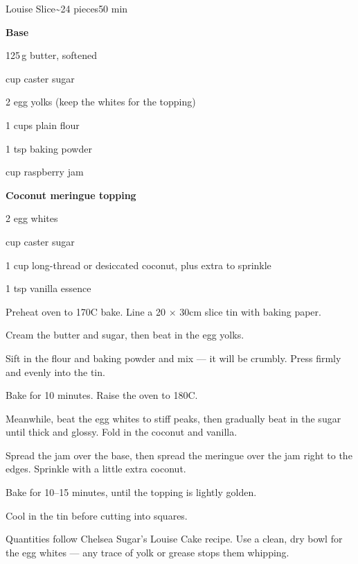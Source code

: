 \begin{recipebox}{Louise Slice}{\textasciitilde24 pieces}{50 min}
\begin{ingredients}
  \item[] \textbf{Base}
  \item 125\,g butter, softened
  \item {} cup caster sugar
  \item 2 egg yolks (keep the whites for the topping)
  \item 1 cups plain flour
  \item 1 tsp baking powder
  \item {} cup raspberry jam
  \item[] \textbf{Coconut meringue topping}
  \item 2 egg whites
  \item {} cup caster sugar
  \item 1 cup long-thread or desiccated coconut, plus extra to sprinkle
  \item 1 tsp vanilla essence
\end{ingredients}

\begin{method}
  \item Preheat oven to 170\degree C bake. Line a 20 $\times$ 30cm slice tin with baking paper.
  \item Cream the butter and sugar, then beat in the egg yolks.
  \item Sift in the flour and baking powder and mix --- it will be crumbly. Press firmly and evenly into the tin.
  \item Bake for 10 minutes. Raise the oven to 180\degree C.
  \item Meanwhile, beat the egg whites to stiff peaks, then gradually beat in the sugar until thick and glossy. Fold in the coconut and vanilla.
  \item Spread the jam over the base, then spread the meringue over the jam right to the edges. Sprinkle with a little extra coconut.
  \item Bake for 10--15 minutes, until the topping is lightly golden.
  \item Cool in the tin before cutting into squares.
\end{method}

\begin{notes}
Quantities follow Chelsea Sugar's Louise Cake recipe.
Use a clean, dry bowl for the egg whites --- any trace of yolk or grease stops them whipping.
\end{notes}
\end{recipebox}
